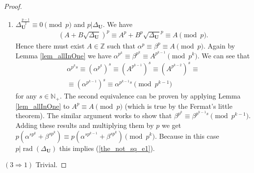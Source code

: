 \documentclass[10pt,a4paper]{amsart}
\DeclareMathOperator{\rad}{rad}
\newcommand{\N}{\mathbb{N}}
\newcommand{\Z}{\mathbb{Z}}
\begin{document}
\begin{proof}
\begin{enumerate}
    \item $\Delta_\mathbf{U}^\frac{p-1}{2} \equiv 0 \pmod p$ and $p|\Delta_\mathbf{U}$. We have
     \begin{align}
         \left(A+B\sqrt{\Delta_{\mathbf U}}\right)^p \equiv
         A^p + B^p\sqrt{\Delta_{\mathbf U}}^p \equiv
         A
         \pmod{p}.
    \end{align}
    Hence there must exist $A\in\Z$ such that $\alpha^p\equiv\beta^p\equiv A\pmod p$. Again by Lemma \ref{lem_allInOne} we have $\alpha^{p^k}\equiv\beta^{p^k}\equiv A^{p^{k-1}}\pmod {p^k}$. We can see that
    \begin{align}
        \alpha^{p^ks} \equiv  
        \left(   \alpha^{p^k} \right)^s  \equiv 
         \left( A^{p^{k-1}}\right)^s  \equiv
         \left( A^{p^{k-2}}\right)^s  \equiv
         \\\equiv
         \left(\alpha^{p^{k-1}}\right)^s  \equiv
          \alpha^{p^{k-1}s} \pmod {p^{k-1}}
    \end{align}
    for any $s\in\N_+$. The second equivalence can be proven by applying Lemma \ref{lem_allInOne} to $A^p\equiv A\pmod p$ (which is true by the Fermat's little theorem). The similar argument works to show that  $\beta^{p^k} \equiv   \beta^{p^{k-1}s} \pmod {p^{k-1}}$. Adding these results and multiplying them by $p$ we get  $ p\left(\alpha^{sp^k}+\beta^{sp^k}\right) \equiv  p\left(\alpha^{sp^{k-1}}+\beta^{sp^k}\right) \pmod {p^k}$. Because in this case $p|\rad(\Delta_\mathbf{U})$ this implies (\ref{the_not_sq_e1}). 

\end{enumerate}


   


    
    

    
    


    \noindent $(3\Rightarrow1)$ Trivial.
\end{proof}
\end{document}
